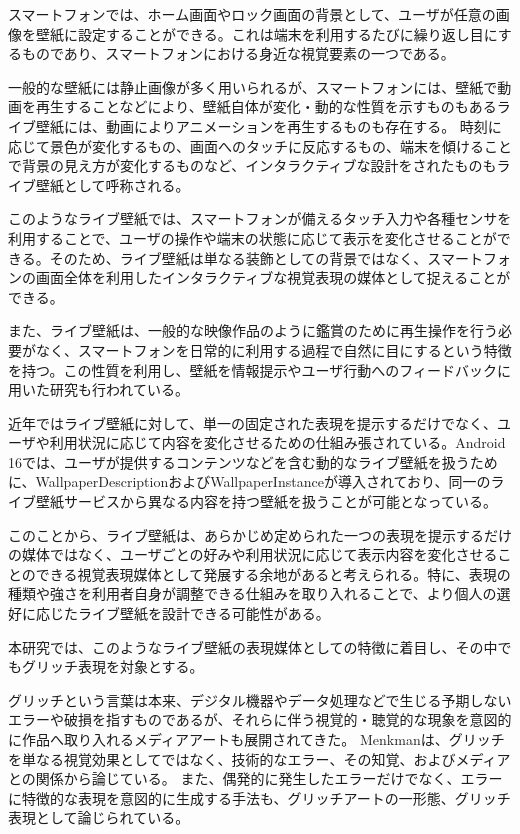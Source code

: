 スマートフォンでは、ホーム画面やロック画面の背景として、ユーザが任意の画像を壁紙に設定することができる。これは端末を利用するたびに繰り返し目にするものであり、スマートフォンにおける身近な視覚要素の一つである。

一般的な壁紙には静止画像が多く用いられるが、スマートフォンには、壁紙で動画を再生することなどにより、壁紙自体が変化・動的な性質を示すものもあるライブ壁紙には、動画によりアニメーションを再生するものも存在する。
時刻に応じて景色が変化するもの、画面へのタッチに反応するもの、端末を傾けることで背景の見え方が変化するものなど、インタラクティブな設計をされたものもライブ壁紙として呼称される。

このようなライブ壁紙では、スマートフォンが備えるタッチ入力や各種センサを利用することで、ユーザの操作や端末の状態に応じて表示を変化させることができる。そのため、ライブ壁紙は単なる装飾としての背景ではなく、スマートフォンの画面全体を利用したインタラクティブな視覚表現の媒体として捉えることができる。

また、ライブ壁紙は、一般的な映像作品のように鑑賞のために再生操作を行う必要がなく、スマートフォンを日常的に利用する過程で自然に目にするという特徴を持つ。この性質を利用し、壁紙を情報提示やユーザ行動へのフィードバックに用いた研究も行われている\cite{dearman2012wallpaper,murray2013avatar,nwagu2023chai}。

近年ではライブ壁紙に対して、単一の固定された表現を提示するだけでなく、ユーザや利用状況に応じて内容を変化させるための仕組み張されている。Android 16では、ユーザが提供するコンテンツなどを含む動的なライブ壁紙を扱うために、WallpaperDescriptionおよびWallpaperInstanceが導入されており、同一のライブ壁紙サービスから異なる内容を持つ壁紙を扱うことが可能となっている\cite{android16_wallpaper}。

このことから、ライブ壁紙は、あらかじめ定められた一つの表現を提示するだけの媒体ではなく、ユーザごとの好みや利用状況に応じて表示内容を変化させることのできる視覚表現媒体として発展する余地があると考えられる。特に、表現の種類や強さを利用者自身が調整できる仕組みを取り入れることで、より個人の選好に応じたライブ壁紙を設計できる可能性がある。

本研究では、このようなライブ壁紙の表現媒体としての特徴に着目し、その中でもグリッチ表現を対象とする。


グリッチという言葉は本来、デジタル機器やデータ処理などで生じる予期しないエラーや破損を指すものであるが、それらに伴う視覚的・聴覚的な現象を意図的に作品へ取り入れるメディアアートも展開されてきた。
Menkmanは、グリッチを単なる視覚効果としてではなく、技術的なエラー、その知覚、およびメディアとの関係から論じている\cite{menkman2011momentum}。
また、偶発的に発生したエラーだけでなく、エラーに特徴的な表現を意図的に生成する手法も、グリッチアートの一形態、グリッチ表現として論じられている。

